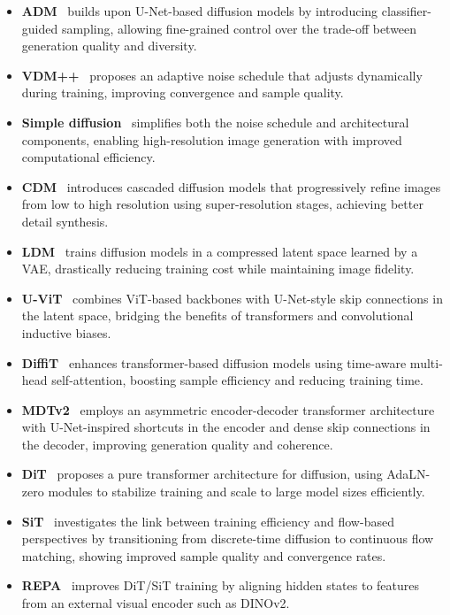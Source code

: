 \begin{itemize}[leftmargin=*]
    \item \textbf{ADM}~\citep{dhariwal2021diffusion} builds upon U-Net-based diffusion models by introducing classifier-guided sampling, allowing fine-grained control over the trade-off between generation quality and diversity.
    \item \textbf{VDM++}~\citep{kingma2023understanding} proposes an adaptive noise schedule that adjusts dynamically during training, improving convergence and sample quality.
    \item \textbf{Simple diffusion}~\citep{hoogeboom2023simple} simplifies both the noise schedule and architectural components, enabling high-resolution image generation with improved computational efficiency.
    \item \textbf{CDM}~\citep{ho2022cascaded} introduces cascaded diffusion models that progressively refine images from low to high resolution using super-resolution stages, achieving better detail synthesis.
    \item \textbf{LDM}~\citep{rombach2022ldm} trains diffusion models in a compressed latent space learned by a VAE, drastically reducing training cost while maintaining image fidelity.
    \item \textbf{U-ViT}~\citep{bao2023all} combines ViT-based backbones with U-Net-style skip connections in the latent space, bridging the benefits of transformers and convolutional inductive biases.
    \item \textbf{DiffiT}~\citep{hatamizadeh2024diffit} enhances transformer-based diffusion models using time-aware multi-head self-attention, boosting sample efficiency and reducing training time.
    \item \textbf{MDTv2}~\citep{gao2023mdtv2} employs an asymmetric encoder-decoder transformer architecture with U-Net-inspired shortcuts in the encoder and dense skip connections in the decoder, improving generation quality and coherence.
    \item \textbf{DiT}~\citep{peebles2023scalable} proposes a pure transformer architecture for diffusion, using AdaLN-zero modules to stabilize training and scale to large model sizes efficiently.
    \item \textbf{SiT}~\citep{ma2024sit} investigates the link between training efficiency and flow-based perspectives by transitioning from discrete-time diffusion to continuous flow matching, showing improved sample quality and convergence rates.
    \item \textbf{REPA}~\citep{yu2024repa} improves DiT/SiT training by aligning hidden states to features from an external visual encoder such as DINOv2.

\end{itemize}
